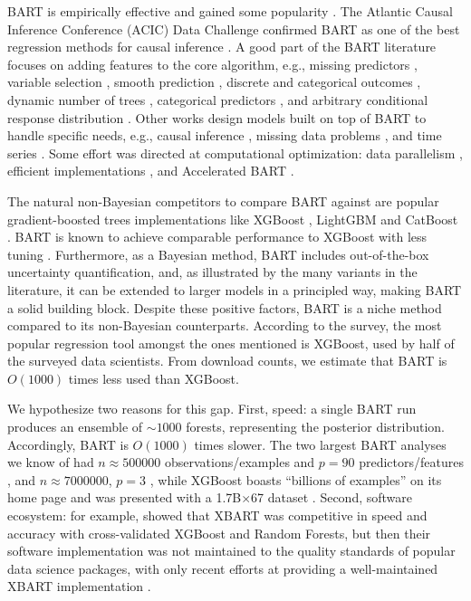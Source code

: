 \documentclass{article}
\begin{document}
BART is empirically effective and gained some popularity \citep[consider,
	e.g.,][]{tan2019}. The Atlantic Causal Inference Conference (ACIC) Data
Challenge confirmed BART as one of the best regression methods for causal
inference \citep{dorie2019,hahn2019,acic2019,thal2023}. A good part of the BART
literature focuses on adding features to the core algorithm, e.g., missing
predictors \citep{kapelner_prediction_2015}, variable selection
\citep{linero2018}, smooth prediction \citep{linero2018b}, discrete and
categorical outcomes \citep{murray_log-linear_2021}, dynamic number of trees
\citep[ch.~3]{collins_improved_2023}, categorical predictors
\citep{deshpande_flexbart_2025}, and arbitrary conditional response distribution
\autocite[i.e., arbitrary ``likelihood'' or ``loss'',][]{linero_generalized_2025}.
Other works design models built on top of BART to handle specific needs, e.g.,
causal inference \citep{hahn2020}, missing data problems \citep{goh_joint_2024},
and time series \citep{huber_inference_2022,lima_minnesota_2025}. Some effort
was directed at computational optimization: data parallelism
\citep{pratola2014}, efficient implementations
\citep{dorie2024,deshpande_flexbart_2025}, and Accelerated BART
\autocite[XBART,][]{he2019,he_stochastic_2023}.

The natural non-Bayesian competitors to compare BART against are popular
gradient-boosted trees implementations like XGBoost \citep{chen2016}, LightGBM
\citep{ke_lightgbm_2017} and CatBoost \citep{prokhorenkova_catboost_2018}.
BART is known to achieve comparable performance to XGBoost with less tuning
\autocites[or better performance with comparable tuning, etc., see][table~2]{linero2018b}[supplementary]{he2019}[\S A]{nguyen2025oblique}. 
Furthermore, as a
Bayesian method, BART includes out-of-the-box uncertainty quantification, and,
as illustrated by the many variants in the literature, it can be extended to
larger models in a principled way, making BART a solid building block. Despite
these positive factors, BART is a niche method compared to its non-Bayesian
counterparts. According to the \citet[p.~35]{kaggle2021} survey, the most
popular regression tool amongst the ones mentioned is XGBoost, used by half of
the surveyed data scientists. From download counts, we estimate that BART is
$O(1000)$ times less used than XGBoost.

We hypothesize two reasons for this gap.
First, speed: a single BART run produces an ensemble of $\mathord{\sim}
	1000$ forests, representing the posterior distribution. Accordingly, BART is
$O(1000)$ times slower. The two largest BART analyses we know of had
$n\approx\num{500000}$ observations/examples and $p=90$ predictors/features
\citep{pratola2020}, and $n\approx\num{7000000}$, $p=3$ \autocite[\S7.2]{pratola2014}, while XGBoost boasts ``billions of examples'' on
its home page and was presented with a 1.7B$\times$67 dataset \autocite[table~2]{chen2016}.
Second, software ecosystem: for example, \citet{he_stochastic_2023} showed
that XBART was competitive in speed and accuracy with cross-validated XGBoost and Random Forests, but then their
software implementation was not maintained to the quality standards of popular
data science packages, with only recent efforts at providing a well-maintained
XBART implementation \citep{herren_stochtree_2026}.
\end{document}

